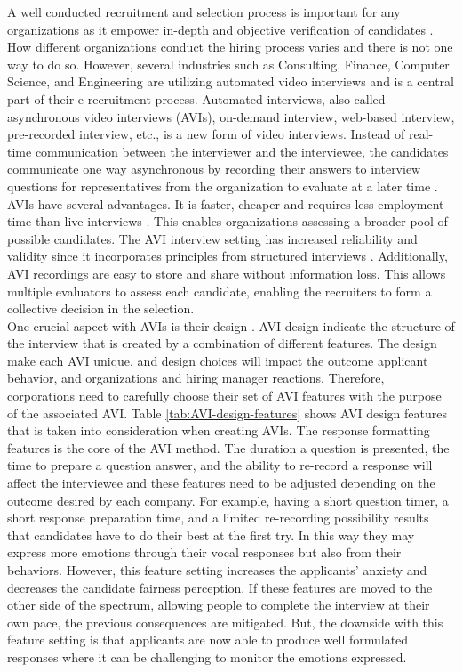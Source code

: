 A well conducted recruitment and selection process is important for any organizations as it empower in-depth and objective verification of candidates \cite{hiring-process-Sołek-BorowskaWilczewska+2018+25+33}. How different organizations conduct the hiring process varies and there is not one way to do so. However, several industries such as Consulting, Finance, Computer Science, and Engineering are utilizing automated video interviews and is a central part of their e-recruitment process. Automated interviews, also called asynchronous video interviews (AVIs), on-demand interview, web-based interview, pre-recorded interview, etc., is a new form of video interviews. Instead of real-time communication between the interviewer and the interviewee, the candidates communicate one way asynchronous by recording their answers to interview questions for representatives from the organization to evaluate at a later time \cite{video-interview1-LUKACIK2022100789}. AVIs have several advantages. It is faster, cheaper and requires less employment time than live interviews \cite{video_interview2-brenner2016asynchronous}. This enables organizations assessing a broader pool of possible candidates. The AVI interview setting has increased reliability and validity since it incorporates principles from structured interviews \cite{video-interview1-LUKACIK2022100789}. Additionally, AVI recordings are easy to store and share without information loss. This allows multiple evaluators to assess each candidate, enabling the recruiters to form a collective decision in the selection.   \\

One crucial aspect with AVIs is their design \cite{video-interview1-LUKACIK2022100789}. AVI design indicate the structure of the interview that is created by a combination of different features. The design make each AVI unique, and design choices will impact the outcome applicant behavior, and organizations and hiring manager reactions. Therefore, corporations need to carefully choose their set of AVI features with the purpose of the associated AVI. Table \ref{tab:AVI-design-features} shows AVI design features that is taken into consideration when creating AVIs. The response formatting features is the core of the AVI method. The duration a question is presented, the time to prepare a question answer, and the ability to re-record a response will affect the interviewee and these features need to be adjusted depending on the outcome desired by each company. For example, having a short question timer, a short response preparation time, and a limited re-recording possibility results that candidates have to do their best at the first try. In this way they may express more emotions through their vocal responses but also from their behaviors. However, this feature setting increases the applicants' anxiety and decreases the candidate fairness perception. If these features are moved to the other side of the spectrum, allowing people to complete the interview at their own pace, the previous consequences are mitigated. But, the downside with this feature setting is that applicants are now able to produce well formulated responses where it can be challenging to monitor the emotions expressed. \\ 

